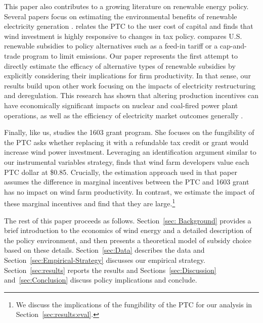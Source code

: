 \documentclass[12pt]{article}
\begin{document}
This paper also contributes to a growing literature on renewable energy policy. Several papers focus on estimating the environmental benefits of renewable electricity generation \citep[e.g.,][]{cullen_measuring_2013,novan_valuing_2015,callaway_location_2018,graff_zivin_spatial_2014}. \citet{metcalf_investment_2010} relates the PTC to the user cost of capital and finds that wind investment is highly responsive to changes in tax policy. \citet{schmalensee_performance_2016} compares U.S. renewable subsidies to policy alternatives such as a feed-in tariff or a cap-and-trade program to limit emissions. Our paper represents the first attempt to directly estimate the efficacy of alternative types of renewable subsidies by explicitly considering their implications for firm productivity. In that sense, our results build upon other work focusing on the impacts of electricity restructuring and deregulation. This research has shown that altering production incentives can have economically significant impacts on nuclear and coal-fired power plant operations, as well as the efficiency of electricity market outcomes generally \citep{fabrizio_markets_2007,davis_deregulation_2012,cicala_when_2015}.

Finally, like us, \cite{johnston_non-refundable_2019} studies the 1603 grant program. She focuses on the fungibility of the PTC asks whether replacing it with a refundable tax credit or grant would increase wind power investment. Leveraging an identification argument similar to our instrumental variables strategy, \citeauthor{johnston_non-refundable_2019} finds that wind farm developers value each PTC dollar at \$0.85. Crucially, the estimation approach used in that paper assumes the difference in marginal incentives between the PTC and 1603 grant has no impact on wind farm productivity. In contrast, we estimate the impact of these marginal incentives and find that they are large.\footnote{We discuss the implications of the fungibility of the PTC for our analysis in Section~\ref{sec:results:eval}.}

The rest of this paper proceeds as follows. Section~\ref{sec: Background} provides a brief introduction to the economics of wind energy and a detailed description of the policy environment, and then presents a theoretical model of subsidy choice based on these details. Section~\ref{sec:Data} describes the data and Section~\ref{sec:Empirical-Strategy} discusses our empirical strategy. Section~\ref{sec:results} reports the results and Sections~\ref{sec:Discussion} and~\ref{sec:Conclusion} discuss policy implications and conclude.
\end{document}
